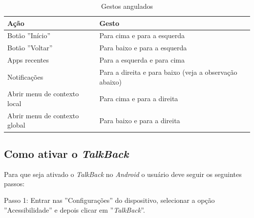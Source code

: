 \begin{table}[H]
    \centering
    \begin{tabular}{|p{7cm}|p{7cm}|}
        \hline
        \textbf{Ação} & \textbf{Gesto} \\ 
        \hline
        Botão ''Início'' & Para cima e para a esquerda \\
        \hline
        Botão ''Voltar'' & Para baixo e para a esquerda \\
        \hline
        Apps recentes & Para a esquerda e para cima \\
        \hline
        Notificações & Para a direita e para baixo 
(veja a observação abaixo) \\
        \hline
        Abrir menu de contexto local & Para cima e para a direita \\
        \hline
        Abrir menu de contexto global & Para baixo e para a direita \\
        \hline
    \end{tabular}
    \caption{Gestos angulados}
    \label{tab:gestos_angulados}
\end{table}

\subsection{Como ativar o \textit{TalkBack}}

Para que seja ativado o \textit{TalkBack} no \textit{Android} o usuário deve seguir os seguintes passos:

Passo 1: Entrar nas ''Configurações'' do dispositivo, selecionar a opção ''Acessibilidade'' e depois clicar em ''\textit{TalkBack}''.

